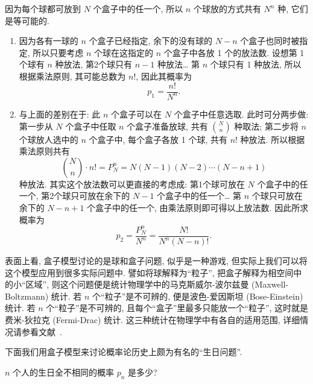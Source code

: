 \begin{solution}
  因为每个球都可放到 $N$ 个盒子中的任一个,
  所以 $n$ 个球放的方式共有 $N^n$ 种,
  它们是等可能的.
  \begin{enumerate}
    \item 因为各有一球的 $n$ 个盒子已经指定,
    余下的没有球的 $N - n$ 个盒子也同时被指定,
    所以只要考虑 $n$ 个球在这指定的 $n$ 个盒子中各放 1 个的放法数.
    设想第 1 个球有 $n$ 种放法,
    第2个球只有 $n - 1$ 种放法\dots
    第 $n$ 个球只有 1 种放法,
    所以根据乘法原则,
    其可能总数为 $n!$,
    因此其概率为
    \begin{equation}
      p _1 = \frac{n!}{N ^n}.
      \label{eq1.2.8}
    \end{equation}

    \item 与上面的差别在于:
    此 $n$ 个盒子可以在 $N$ 个盒子中任意选取.
    此时可分两步做:
    第一步从 $N$ 个盒子中任取 $n$ 个盒子准备放球,
    共有 $\binom{N}{n}$ 种取法;
    第二步将 $n$ 个球放人选中的 $n$ 个盒子中,
    每个盒子各放 1 个球,
    共有 $n!$ 种放法.
    所以根据乘法原则共有
    \[
      \binom{N}{n} \cdot n! = P _N ^n = N (N - 1) (N - 2) \dotsb (N - n + 1)
    \]
    种放法.
    其实这个放法数可以更直接的考虑成:
    第1个球可放在 $N$ 个盒子中的任一个,
    第2个球只可放在余下的 $N-1$ 个盒子中的任一个\dots
    第 $n$ 个球只可放在余下的 $N-n+1$ 个盒子中的任一个,
    由乘法原则即可得以上放法数.
    因此所求概率为
    \begin{equation}
      p_2 = \frac{P _N ^n}{N ^n} = \frac{N!}{N ^n (N - n)!}.
      \label{eq1.2.9}
    \end{equation}
  \end{enumerate}
\end{solution}

表面上看,
盒子模型讨论的是球和盒子问题,
似乎是一种游戏,
但实际上我们可以将这个模型应用到很多实际问题中.
譬如将球解释为“粒子”,
把盒子解释为相空间中的小“区域”,
则这个问题便是统计物理学中的马克斯威尔-波尔兹曼 (Maxwell-Boltzmann) 统计.
若 $n$ 个“粒子”是不可辨的,
便是波色-爱因斯坦 (Bose-Einstein) 统计.
若 $n$ 个“粒子”是不可辨的,
且每个“盒子”里最多只能放一个“粒子”,
这时就是费米-狄拉克 (Fermi-Drac) 统计.
这三种统计在物理学中有各自的适用范围,
详细情况请参看文献~\cite{bo1956gai}.

下面我们用盒子模型来讨论概率论历史上颇为有名的“生日问题”.

\begin{example}[生日问题]
  $n$ 个人的生日全不相同的概率 $p_n$ 是多少?
\end{example}

